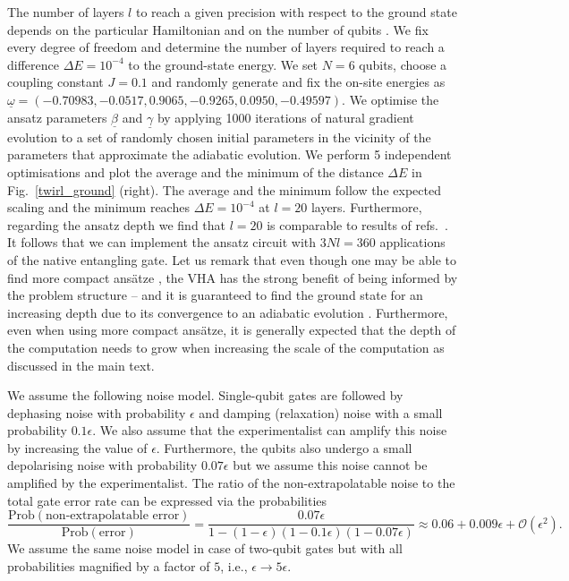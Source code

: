 \documentclass[aps,prx,showpacs,twocolumn,reprint]{revtex4-2}
\begin{document}
{	The number of layers $l$ to reach a given precision with respect to the ground state
	depends on the particular Hamiltonian and on the number of qubits \cite{PRXQuantum.1.020319,zhou2020quantum}.
	We fix every degree of freedom and determine the number of layers required to reach a difference
	$\Delta E = 10^{-4}$ to the ground-state energy. We set $N=6$ qubits, choose a coupling constant $J=0.1$  and
	randomly generate and fix the on-site energies as $\underline{\omega} =
	(-0.70983, -0.0517, 0.9065, -0.9265, 0.0950, -0.49597)$.
	We optimise the ansatz parameters
	$\underline{\beta}$ and $\underline{\gamma}$ by applying 1000 iterations of natural gradient evolution
	to a set of randomly chosen initial parameters in the vicinity of the parameters that approximate the
	adiabatic evolution.	
	We perform 5 independent optimisations and plot the average and the minimum of the distance $\Delta E$
	in Fig.~\ref{twirl_ground} (right). The average and the minimum follow the expected scaling \cite{PRXQuantum.1.020319,zhou2020quantum}
	and the minimum reaches $\Delta E = 10^{-4}$ at $l=20$ layers. Furthermore, regarding the ansatz depth we find that $l=20$ is comparable to
	results of refs.~\cite{niu2019optimizing,zhou2020quantum,PRXQuantum.1.020319}. It follows that we can implement
	the ansatz circuit with $3Nl = 360$ applications of the native entangling gate.
	Let us remark that even though one may be able to find more compact ans{\"a}tze \cite{grimsley2019adaptive}, the VHA
	has the strong benefit of being informed by
	the problem structure -- and it is guaranteed to find the ground state for an increasing depth due to its
	convergence to an adiabatic evolution \cite{farhi2014quantum}. Furthermore, even when using more compact ans{\"a}tze,
	it is generally expected that the depth of the computation needs to grow when increasing the scale of the computation
	as discussed in the main text. 

We assume the following noise model. Single-qubit gates are followed by dephasing noise with probability
$\epsilon$ and damping (relaxation) noise with a small probability $0.1\epsilon$. We also assume that
the experimentalist can amplify this noise by increasing the value of $\epsilon$. Furthermore, the qubits also
undergo a small depolarising noise with probability $0.07 \epsilon$ but we assume this noise cannot
be amplified by the experimentalist. The ratio of the non-extrapolatable noise to the total gate error rate
can be expressed via the probabilities
\begin{equation*}
	\frac{
		\mathrm{Prob}(\text{non-extrapolatable error})
	}{
		\mathrm{Prob}(\mathrm{error})
	}
= \frac{
	 0.07\epsilon
}{
	1-(1-\epsilon)(1-0.1\epsilon)(1-0.07\epsilon) 
}
\approx 0.06 + 0.009 \epsilon + \mathcal{O}(\epsilon^2).
\end{equation*}
We assume the same noise model in case of two-qubit gates but
with all probabilities magnified by a factor of $5$, i.e., $\epsilon \rightarrow 5 \epsilon$.


}
\end{document}
